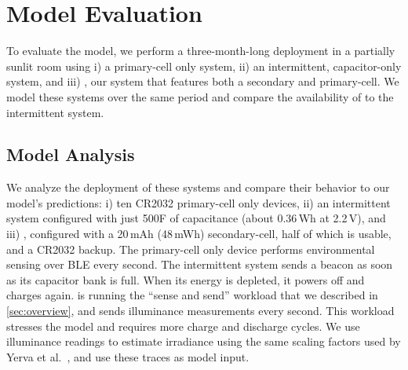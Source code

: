 %
%
%

\section{Model Evaluation}
\label{sec:eval}
To evaluate the model, we perform a three-month-long deployment in a partially sunlit room
using i) a primary-cell only system, ii) an intermittent, capacitor-only system, and iii) \name, our
system that features both a secondary and primary-cell. We model these
systems over the same period and compare the availability of \name to the
intermittent system.

\subsection{Model Analysis}
\label{sec:eval:model}
We analyze the deployment of these systems
and compare their behavior to our
model's predictions: i) ten CR2032 primary-cell only devices, ii) an
intermittent system configured with just 500\textmu F of capacitance (about
0.36\,\textmu Wh at 2.2\,V), and iii) \name, configured with a 20\,mAh
(48\,mWh) secondary-cell, half of which is usable, and a CR2032 backup.  The
primary-cell only device performs environmental sensing over BLE every second.
The intermittent system  sends a beacon as soon as its capacitor bank is full.
When its energy is depleted, it powers off and charges
again. \name is running the ``sense and send'' workload that we described in
\cref{sec:overview}, and sends illuminance measurements every second. This
workload stresses the model and requires more charge and discharge cycles.  We
use \name illuminance readings to estimate irradiance using the same scaling factors used by
Yerva et al.~\cite{yervaGrafting12}, and use these traces as
model input.\\


